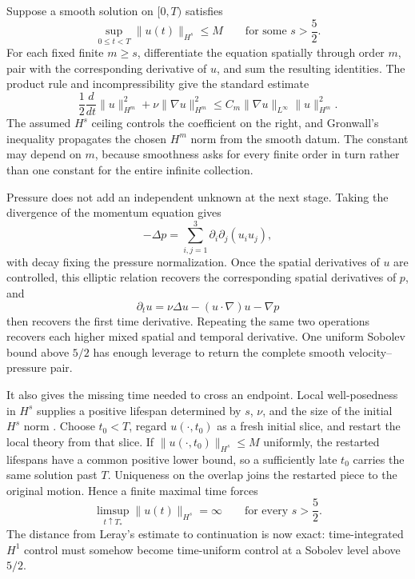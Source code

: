 Suppose a smooth solution on \([0,T)\) satisfies
\[
  \sup_{0\leq t<T}\lVert u(t)\rVert_{H^s}
  \leq M
  \qquad
  \text{for some }s>\frac52.
\]
For each fixed finite \(m\geq s\), differentiate the equation spatially through order \(m\), pair with the corresponding derivative of \(u\), and sum the resulting identities.
The product rule and incompressibility give the standard estimate
\[
  \frac12\frac{d}{dt}\lVert u\rVert_{H^m}^2
  +
  \nu\lVert\nabla u\rVert_{H^m}^2
  \leq
  C_m\lVert\nabla u\rVert_{L^\infty}
  \lVert u\rVert_{H^m}^2.
\]
The assumed \(H^s\) ceiling controls the coefficient on the right, and Gronwall's inequality propagates the chosen \(H^m\) norm from the smooth datum.
The constant may depend on \(m\), because smoothness asks for every finite order in turn rather than one constant for the entire infinite collection.

Pressure does not add an independent unknown at the next stage.
Taking the divergence of the momentum equation gives
\[
  -\Delta p
  =
  \sum_{i,j=1}^3\partial_i\partial_j(u_i u_j),
\]
with decay fixing the pressure normalization.
Once the spatial derivatives of \(u\) are controlled, this elliptic relation recovers the corresponding spatial derivatives of \(p\), and
\[
  \partial_tu
  =
  \nu\Delta u-(u\cdot\nabla)u-\nabla p
\]
then recovers the first time derivative.
Repeating the same two operations recovers each higher mixed spatial and temporal derivative.
One uniform Sobolev bound above \(5/2\) has enough leverage to return the complete smooth velocity--pressure pair.

It also gives the missing time needed to cross an endpoint.
Local well-posedness in \(H^s\) supplies a positive lifespan determined by \(s\), \(\nu\), and the size of the initial \(H^s\) norm \parencite{FujitaKato1964,Kato1984}.
Choose \(t_0<T\), regard \(u(\cdot,t_0)\) as a fresh initial slice, and restart the local theory from that slice.
If \(\lVert u(\cdot,t_0)\rVert_{H^s}\leq M\) uniformly, the restarted lifespans have a common positive lower bound, so a sufficiently late \(t_0\) carries the same solution past \(T\).
Uniqueness on the overlap joins the restarted piece to the original motion.
Hence a finite maximal time forces
\[
  \limsup_{t\uparrow T_*}
  \lVert u(t)\rVert_{H^s}
  =\infty
  \qquad
  \text{for every }s>\frac52.
\]
The distance from Leray's estimate to continuation is now exact: time-integrated \(H^1\) control must somehow become time-uniform control at a Sobolev level above \(5/2\).


